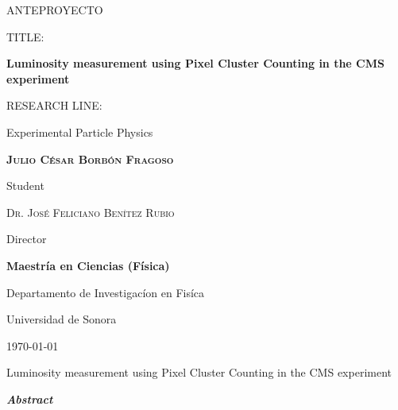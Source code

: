 \documentclass[final,12p]{article}
\def\Student{Julio C\'{e}sar Borb\'{o}n Fragoso}
\def\Title{ANTEPROYECTO}
\def\Prog{Maestr\'{i}a en Ciencias (F\'{i}sica) }
\def\Dept{Departamento de Investigac\'{i}on en Fis\'{i}ca}
\def\Institution{Universidad de Sonora}
\def\Director{Dr. Jos\'{e} Feliciano Ben\'{i}tez Rubio}
\def\ProjectTitle{Luminosity measurement using Pixel Cluster Counting in the CMS experiment}
\def\ResearchLine{Experimental Particle Physics}
\begin{document}
\onehalfspacing

\begin{titlepage}
\centering
\hspace{0pt}
\vfill
{\scshape\Large \Title \par}
  
  \vspace{2cm}
  {
    TITLE:\par
    {\bf \large \ProjectTitle \par}
  }
       
  \vspace{0.5cm}
  {
    RESEARCH LINE: \par
    \ResearchLine \par
  }
        
  \vspace{4cm}
  {\underline{\hspace{8cm}}\par}
  {\bf \scshape \Student \par}
  {Student\par}

  \vspace{1cm}
  {\underline{\hspace{8cm}}\par}
  {\scshape \Director \par}
  {Director\par}

  \vspace{1cm}
  {\bf \Prog \par}
  {\Dept \par}
  {\Institution \par}

  \vspace{4cm}
  {\today}

\hspace{0pt}
\vfill

\end{titlepage}


\shipout\null


\newpage
\hspace{2pt}
\vfill

  \begin{center}
    {\Large \ProjectTitle \par}
    \vspace{1cm}
    {\itshape\textbf{Abstract}\par}
  \end{center}
  
\end{document}
